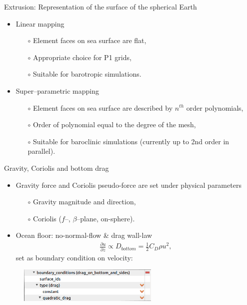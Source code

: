 \begin{frame}{Extrusion: Representation of the surface of the spherical Earth}
\begin{itemize}
  \item Linear mapping
  \begin{itemize}
    \item[$\circ$] Element faces on sea surface are flat,
    \item[$\circ$] Appropriate choice for P1 grids,
    \item[$\circ$] Suitable for barotropic simulations.
  \end{itemize}
  \item Super--parametric mapping
  \begin{itemize}
    \item[$\circ$] Element faces on sea surface are described by $n^{th}$ order polynomials,
    \item[$\circ$] Order of polynomial equal to the degree of the mesh,
    \item[$\circ$] Suitable for baroclinic simulations (currently up to 2nd order in parallel).
  \end{itemize}
\end{itemize}

\end{frame}

\begin{frame}{Gravity, Coriolis and bottom drag}
\begin{itemize}
  \item Gravity force and Coriolis pseudo-force are set under physical parameters
  \begin{itemize}
    \item[$\circ$] Gravity magnitude and direction,
    \item[$\circ$] Coriolis ($f$--, $\beta$--plane, on-sphere).
  \end{itemize}
  \item Ocean floor: no-normal-flow \& drag wall-law
  \begin{align*}
  \frac{\partial u}{\partial z} \propto D_{bottom} = \frac{1}{2} C_D \rho u^{2},
  \end{align*}
  set as boundary condition on velocity:
\end{itemize}
\begin{figure}[htbp!]
 \centering
  \includegraphics[width=0.6\textwidth]{./tides_in_the_Mediterranean_Sea/figures/bottom_drag}
\end{figure}
\end{frame}

